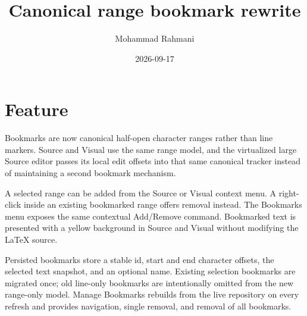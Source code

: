 \documentclass[a4paper]{article}
\title{Canonical range bookmark rewrite}
\date{2026-09-17}
\author{Mohammad Rahmani}
\begin{document}
\maketitle

\section{Feature}
Bookmarks are now canonical half-open character ranges rather than line
markers.  Source and Visual use the same range model, and the virtualized large
Source editor passes its local edit offsets into that same canonical tracker
instead of maintaining a second bookmark mechanism.

A selected range can be added from the Source or Visual context menu.  A
right-click inside an existing bookmarked range offers removal instead.  The
Bookmarks menu exposes the same contextual Add/Remove command.  Bookmarked text
is presented with a yellow background in Source and Visual without modifying
the LaTeX source.

Persisted bookmarks store a stable id, start and end character offsets, the
selected text snapshot, and an optional name.  Existing selection bookmarks are
migrated once; old line-only bookmarks are intentionally omitted from the new
range-only model.  Manage Bookmarks rebuilds from the live repository on every
refresh and provides navigation, single removal, and removal of all bookmarks.
\end{document}
